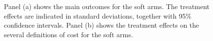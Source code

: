 \documentclass[oneside,11pt]{article}
\begin{document}
\begin{figure}[H]
\begin{center}
    \end{center}
    \scriptsize
    Panel (a) shows the main outcomes for the soft arms. The treatment effects are indicated in standard deviations, together with 95\% confidence intervals. Panel (b) shows the treatment effects on the several definitions of cost for the soft arms. 
\end{figure}

\cleardoublepage
\end{document}
